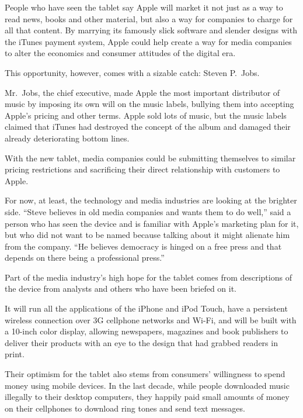 ﻿\documentclass[12pt]{article}
\begin{document}
People who have seen the tablet say Apple will market it not just as a way to read news, books and
other material, but also a way for companies to charge for all that content. By marrying its
famously slick software and slender designs with the iTunes payment system, Apple could help create
a way for media companies to alter the economics and consumer attitudes of the digital era.


This opportunity, however, comes with a sizable catch: Steven P.~Jobs.

Mr.~Jobs, the chief executive, made Apple the most important distributor of music by imposing its
own will on the music labels, bullying them into accepting Apple's pricing and other terms. Apple
sold lots of music, but the music labels claimed that iTunes had destroyed the concept of the album
and damaged their already deteriorating bottom lines.

With the new tablet, media companies could be submitting themselves to similar pricing restrictions
and sacrificing their direct relationship with customers to Apple.

For now, at least, the technology and media industries are looking at the brighter side. ``Steve
believes in old media companies and wants them to do well,'' said a person who has seen the device
and is familiar with Apple's marketing plan for it, but who did not want to be named because talking
about it might alienate him from the company. ``He believes democracy is hinged on a free press and
that depends on there being a professional press.''

Part of the media industry's high hope for the tablet comes from descriptions of the device from
analysts and others who have been briefed on it.

It will run all the applications of the iPhone and iPod Touch, have a persistent wireless connection
over 3G cellphone networks and Wi-Fi, and will be built with a 10-inch color display, allowing
newspapers, magazines and book publishers to deliver their products with an eye to the design that
had grabbed readers in print.

Their optimism for the tablet also stems from consumers' willingness to spend money using mobile
devices. In the last decade, while people downloaded music illegally to their desktop computers,
they happily paid small amounts of money on their cellphones to download ring tones and send text
messages.
\end{document}
